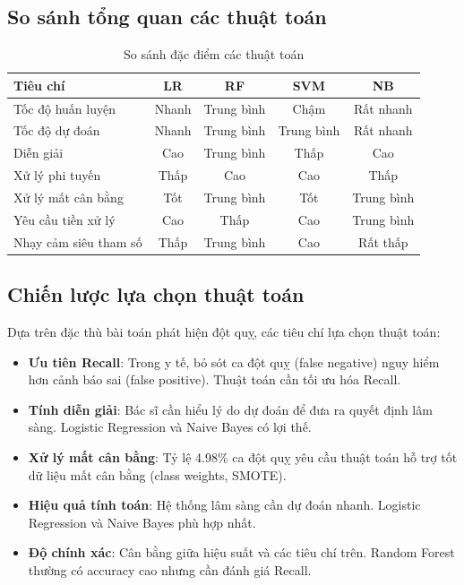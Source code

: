 ﻿\documentclass{article}
\begin{document}
\subsection{So sánh tổng quan các thuật toán}

\begin{table}[h]
\centering
\begin{tabular}{|l|c|c|c|c|}
\hline
\textbf{Tiêu chí} & \textbf{LR} & \textbf{RF} & \textbf{SVM} & \textbf{NB} \\
\hline
Tốc độ huấn luyện & Nhanh & Trung bình & Chậm & Rất nhanh \\
Tốc độ dự đoán & Nhanh & Trung bình & Trung bình & Rất nhanh \\
Diễn giải & Cao & Trung bình & Thấp & Cao \\
Xử lý phi tuyến & Thấp & Cao & Cao & Thấp \\
Xử lý mất cân bằng & Tốt & Trung bình & Tốt & Trung bình \\
Yêu cầu tiền xử lý & Cao & Thấp & Cao & Trung bình \\
Nhạy cảm siêu tham số & Thấp & Trung bình & Cao & Rất thấp \\
\hline
\end{tabular}
\caption{So sánh đặc điểm các thuật toán}
\label{tab:algorithm_comparison}
\end{table}

\subsection{Chiến lược lựa chọn thuật toán}

Dựa trên đặc thù bài toán phát hiện đột quỵ, các tiêu chí lựa chọn thuật toán:

\begin{itemize}
    \item \textbf{Ưu tiên Recall}: Trong y tế, bỏ sót ca đột quỵ (false negative) nguy hiểm hơn cảnh báo sai (false positive). Thuật toán cần tối ưu hóa Recall.
    
    \item \textbf{Tính diễn giải}: Bác sĩ cần hiểu lý do dự đoán để đưa ra quyết định lâm sàng. Logistic Regression và Naive Bayes có lợi thế.
    
    \item \textbf{Xử lý mất cân bằng}: Tỷ lệ 4.98\% ca đột quỵ yêu cầu thuật toán hỗ trợ tốt dữ liệu mất cân bằng (class weights, SMOTE).
    
    \item \textbf{Hiệu quả tính toán}: Hệ thống lâm sàng cần dự đoán nhanh. Logistic Regression và Naive Bayes phù hợp nhất.
    
    \item \textbf{Độ chính xác}: Cân bằng giữa hiệu suất và các tiêu chí trên. Random Forest thường có accuracy cao nhưng cần đánh giá Recall.
\end{itemize}
\end{document}
